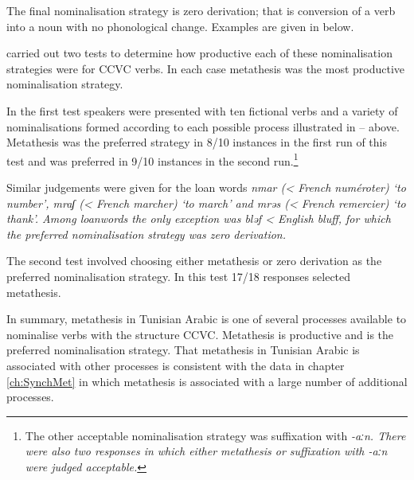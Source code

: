 The final nominalisation strategy is zero derivation;
that is conversion of a verb into a noun with no phonological change.
Examples are given in  below.

\begin{exe}
	\label{ex:TunAraZerDer}
\end{exe}

\citet[71]{kidr86} carried out two tests to determine
how productive each of these nominalisation strategies were for CCVC verbs.
In each case metathesis was the most productive nominalisation strategy.

In the first test speakers were presented with ten fictional verbs
and a variety of nominalisations formed according
to each possible process illustrated in -- above.
Metathesis was the preferred strategy in 8/10 instances
in the first run of this test and was preferred in 9/10 instances in the second run.\footnote{
		The other acceptable nominalisation strategy was suffixation with \it{-aːn}.
		There were also two responses in which either metathesis or suffixation with \it{-aːn}
		were judged acceptable.}

Similar judgements were given for the loan words
\it{nmar} (< French \it{numéroter}) `to number',
\it{mraʃ} (< French \it{marcher}) `to march'
and \it{mrəs} (< French \it{remercier}) `to thank'.
Among loanwords the only exception was \it{bləf} < English \it{bluff},
for which the preferred nominalisation strategy was zero derivation.

The second test \citeauthor{kidr86}
involved choosing either metathesis or zero derivation
as the preferred nominalisation strategy.
In this test 17/18 responses selected metathesis.

In summary, metathesis in Tunisian Arabic is one of several processes
available to nominalise verbs with the structure CCVC.
Metathesis is productive and is the preferred nominalisation strategy.
That metathesis in Tunisian Arabic is associated with other processes
is consistent with the data in chapter \ref{ch:SynchMet}
in which metathesis is associated with
a large number of additional processes.
